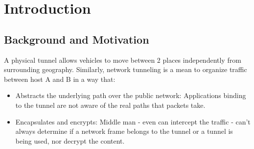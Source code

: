 \cleardoublepage\chapter{Introduction}
\minitoc\label{sec:introduction}\vspace{.5cm}

\section{Background and Motivation}
A physical tunnel allows vehicles to move between 2 places independently from surrounding geography. 
Similarly, network tunneling is a mean to organize traffic between host A and B in a way that:

\begin{itemize}
    \item Abstracts the underlying path over the public network: Applications binding to the tunnel are not aware of the real paths that packets take.
    \item Encapsulates and encrypts: Middle man - even can intercept the traffic - can't always determine if a network frame belongs to the tunnel or a tunnel is being used, nor decrypt the content.
\end{itemize}

